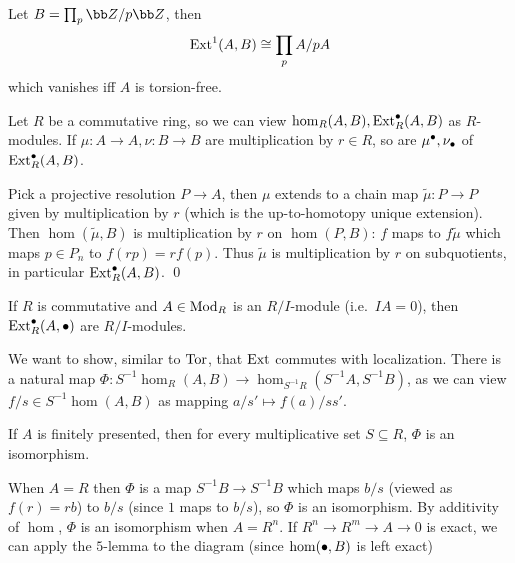 \eproof

\bexam

    Let $B=\prod_p\bZ/p\bZ$, then
    $$ {\rm Ext}^1(A,B) \cong \prod_p A/pA $$
    which vanishes iff $A$ is torsion-free.

\eexam

\blemm

    Let $R$ be a commutative ring, so we can view $\hom_R(A,B),{\rm Ext}_R^\bullet(A,B)$ as $R$-modules.
    If $\mu\colon A\to A,\nu\colon B\to B$ are multiplication by $r\in R$, so are $\mu^\bullet,\nu_\bullet$ of ${\rm Ext}_R^\bullet(A,B)$.

\elemm

\bproof

    Pick a projective resolution $P\to A$, then $\mu$ extends to a chain map $\tilde\mu\colon P\to P$ given by multiplication by $r$ (which is the up-to-homotopy unique extension).
    Then $\hom(\tilde\mu,B)$ is multiplication by $r$ on $\hom(P,B)$: $f$ maps to $f\tilde\mu$ which maps $p\in P_n$ to $f(rp)=rf(p)$.
    Thus $\tilde\mu$ is multiplication by $r$ on subquotients, in particular ${\rm Ext}^\bullet_R(A,B)$.
    \qed

\eproof

\bcoro

    If $R$ is commutative and $A\in{\rm Mod}_R$ is an $R/I$-module (i.e.\ $IA=0$), then ${\rm Ext}^\bullet_R(A,\bullet)$ are $R/I$-modules.

\ecoro

We want to show, similar to ${\rm Tor}$, that ${\rm Ext}$ commutes with localization.
There is a natural map $\Phi\colon S^{-1}\hom_R(A,B)\to\hom_{S^{-1}R}(S^{-1}A,S^{-1}B)$, as we can view $f/s\in S^{-1}\hom(A,B)$ as mapping $a/s'\mapsto f(a)/ss'$.

\blemm

    If $A$ is finitely presented, then for every multiplicative set $S\subseteq R$, $\Phi$ is an isomorphism.

\elemm

\bproof

    When $A=R$ then $\Phi$ is a map $S^{-1}B\to S^{-1}B$ which maps $b/s$ (viewed as $f(r)=rb$) to $b/s$ (since $1$ maps to $b/s$), so $\Phi$ is an isomorphism.
    By additivity of $\hom$, $\Phi$ is an isomorphism when $A=R^n$.
    If $R^n\to R^m\to A\to0$ is exact, we can apply the $5$-lemma to the diagram (since $\hom(\bullet,B)$ is left exact)

    \centerline{}

